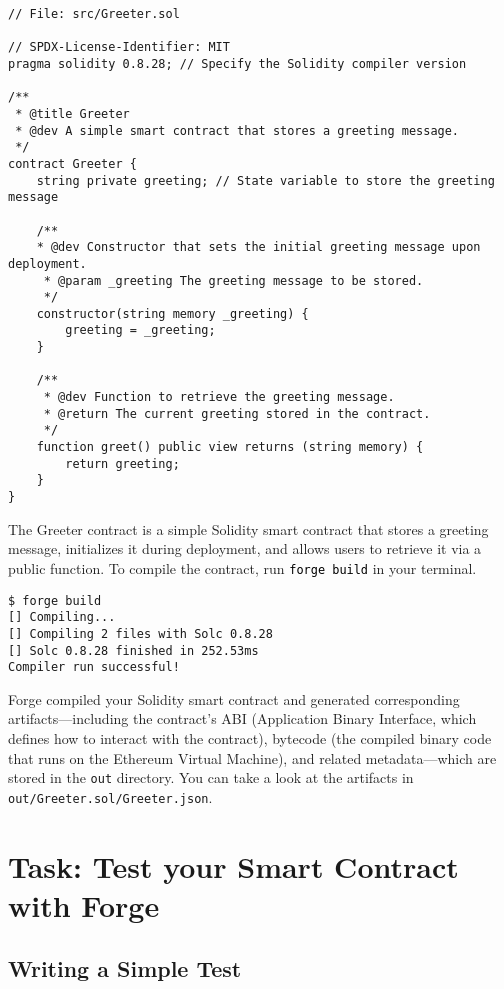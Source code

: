 \documentclass[12pt]{article}
\newcommand{\codeblack}[1]{%
  \texttt{\colorbox{black!7}{\textcolor{black}{#1}}}%
}
\begin{document}
\noindent
\begin{minipage}[c]{\textwidth}
\begin{lstlisting}[language=Solidity]
// File: src/Greeter.sol

// SPDX-License-Identifier: MIT
pragma solidity 0.8.28; // Specify the Solidity compiler version

/**
 * @title Greeter
 * @dev A simple smart contract that stores a greeting message.
 */
contract Greeter {
    string private greeting; // State variable to store the greeting message

    /**
    * @dev Constructor that sets the initial greeting message upon deployment.
     * @param _greeting The greeting message to be stored.
     */
    constructor(string memory _greeting) {
        greeting = _greeting;
    }

    /**
     * @dev Function to retrieve the greeting message.
     * @return The current greeting stored in the contract.
     */
    function greet() public view returns (string memory) {
        return greeting;
    }
}
\end{lstlisting}
\end{minipage}

The Greeter contract is a simple Solidity smart contract that stores a greeting message, initializes it during deployment, and allows users to retrieve it via a public function. To compile the contract, run \codeblack{forge build} in your terminal.

\begin{verbatim}
$ forge build
[] Compiling...
[] Compiling 2 files with Solc 0.8.28
[] Solc 0.8.28 finished in 252.53ms
Compiler run successful!
\end{verbatim}

Forge compiled your Solidity smart contract and generated corresponding artifacts—including the contract's ABI (Application Binary Interface, which defines how to interact with the contract), bytecode (the compiled binary code that runs on the Ethereum Virtual Machine), and related metadata—which are stored in the \texttt{out} directory. You can take a look at the artifacts in \texttt{out/Greeter.sol/Greeter.json}.

\section{Task: Test your Smart Contract with Forge}

\subsection{Writing a Simple Test}
\end{document}
